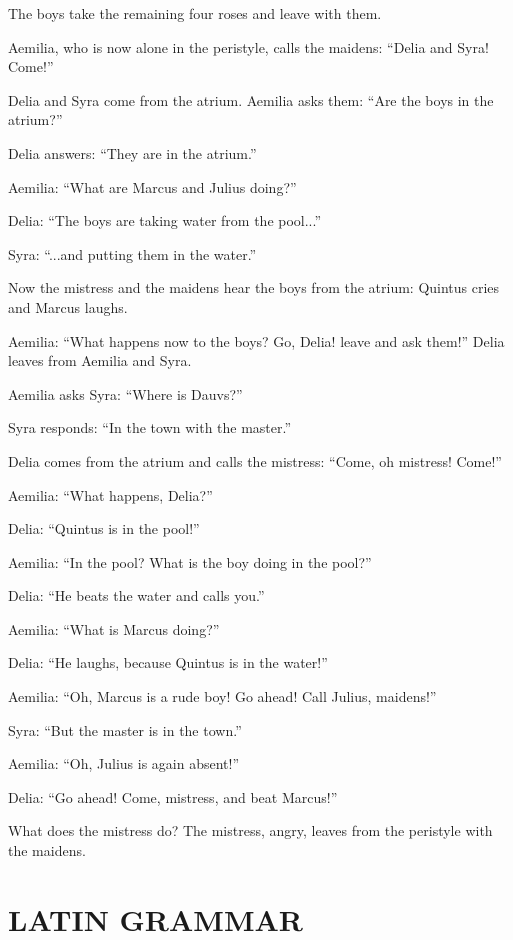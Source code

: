 The boys take the remaining four roses and leave with them.

Aemilia, who is now alone in the peristyle, calls the maidens: ``Delia and Syra! Come!''

Delia and Syra come from the atrium. Aemilia asks them: ``Are the boys in the atrium?''

Delia answers: ``They are in the atrium.''

Aemilia: ``What are Marcus and Julius doing?''

Delia: ``The boys are taking water from the pool...''

Syra: ``...and putting them in the water.''

Now the mistress and the maidens hear the boys from the atrium: Quintus cries and Marcus laughs.

Aemilia: ``What happens now to the boys? Go, Delia! leave and ask them!'' Delia leaves from Aemilia and Syra.

Aemilia asks Syra: ``Where is Dauvs?''

Syra responds: ``In the town with the master.''

Delia comes from the atrium and calls the mistress: ``Come, oh mistress! Come!''

Aemilia: ``What happens, Delia?''

Delia: ``Quintus is in the pool!''

Aemilia: ``In the pool? What is the boy doing in the pool?''

Delia: ``He beats the water and calls you.''

Aemilia: ``What is Marcus doing?''

Delia: ``He laughs, because Quintus is in the water!''

Aemilia: ``Oh, Marcus is a rude boy! Go ahead! Call Julius, maidens!''

Syra: ``But the master is in the town.''

Aemilia: ``Oh, Julius is again absent!''

Delia: ``Go ahead! Come, mistress, and beat Marcus!''

What does the mistress do? The mistress, angry, leaves from the peristyle with the maidens.



\section[Grammar]{LATIN GRAMMAR}
